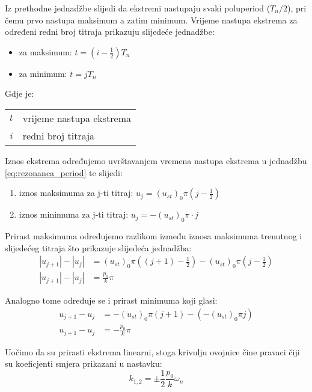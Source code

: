 Iz prethodne jednadžbe slijedi da ekstremi nastupaju svaki poluperiod ($T_n/2$), pri
čemu prvo nastupa maksimum a zatim minimum. Vrijeme nastupa ekstrema za određeni
redni broj titraja prikazuju slijedeće jednadžbe:
\begin{itemize}
    \item za maksimum: $t=(i-\frac{1}{2})T_n$
    \item za minimum: $t=jT_n$
\end{itemize}
Gdje je:
\begin{table}[H]
    \begin{tabular} {r l}
        $t$ & vrijeme nastupa ekstrema\\
        $i$ & redni broj titraja\\
    \end{tabular}
\end{table}
Iznos ekstrema određujemo uvrštavanjem vremena nastupa ekstrema u jednadžbu
\eqref{eq:rezonanca_period} te slijedi:
\begin{enumerate}
    \item iznos maksimuma za j-ti titraj: $u_j=(u_{st})_0\pi(j-\frac{1}{2})$
    \item iznos minimuma za j-ti titraj: $u_j=-(u_{st})_0\pi\cdot j$ 
\end{enumerate}

Prirast maksimuma određujemo razlikom između iznosa maksimuma trenutnog i slijedećeg
titraja što prikazuje slijedeća jednadžba:
\begin{equation}\label{eq:prirast_maksimuma}
    \begin{split}
        |u_{j+1}|-|u_j| &=(u_{st})_0\pi((j+1)-\frac{1}{2})-(u_{st})_0\pi(j-\frac{1}{2})\\
        |u_{j+1}|-|u_j| &= \frac{p_0}{k}\pi
    \end{split}
\end{equation}

Analogno tome određuje se i prirast minimuma koji glasi:
\begin{equation}\label{eq:prirast_minimuma}
    \begin{split}
        u_{j+1}-u_j &= -(u_{st})_0\pi(j+1)-(-(u_{st})_0\pi j)\\
        u_{j+1}-u_j &= -\frac{p_0}{k}\pi
    \end{split}
\end{equation}

Uočimo da su prirasti ekstrema linearni, stoga krivulju ovojnice čine pravaci čiji
su koeficjenti smjera prikazani u nastavku:
\begin{equation}\label{eq:koef_smjera_envelopa}
    k_{1,2}=\pm\frac{1}{2}\frac{p_0}{k}\omega_n
\end{equation}

